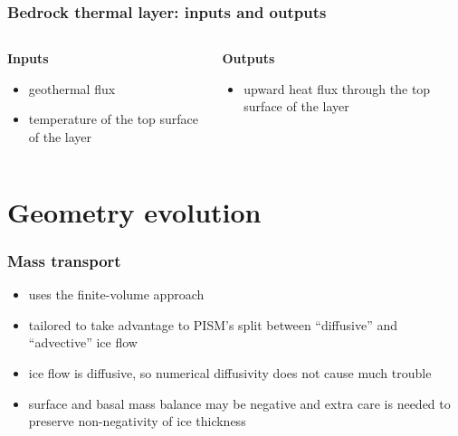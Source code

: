 \documentclass[hide notes,intlimits]{beamer}
\begin{document}

\begin{frame}
  \frametitle{Bedrock thermal layer: inputs and outputs}

  \begin{columns}[t]
    \begin{column}{0.5\linewidth}
      \textbf{Inputs}

      \begin{itemize}
      \item geothermal flux
      \item temperature of the top surface of the layer
      \end{itemize}
    \end{column}
    \begin{column}{0.5\linewidth}
      \textbf{Outputs}

      \begin{itemize}
      \item upward heat flux through the top surface of the layer
      \end{itemize}
    \end{column}
  \end{columns}
\end{frame}

\section{Geometry evolution}
\label{sec:geometry-evolution}

\begin{frame}
  \frametitle{Mass transport}
  \begin{itemize}
  \item uses the finite-volume approach
  \item tailored to take advantage to PISM's split between
    ``diffusive'' and ``advective'' ice flow
  \item ice flow is diffusive, so numerical diffusivity does not cause
    much trouble
  \item surface and basal mass balance may be negative and extra care
    is needed to preserve non-negativity of ice thickness
  \end{itemize}
\end{frame}

\end{document}
